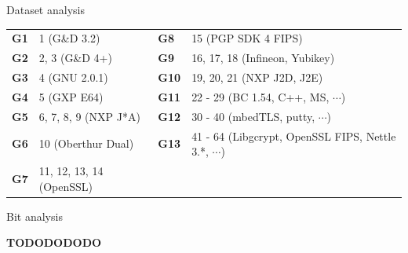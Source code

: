 \documentclass{beamer}
\begin{document}
\begin{darkframes}
\begin{frame}{Dataset analysis}
      \begin{table}[!b]
        {\carlitoTLF %
        \begin{tabularx}{\textwidth}{sX|sX}
          \toprule
          \textbf{G1} & 1 {\color[HTML]{9B9B9B} (G\&D 3.2)} & \textbf{G8} & 15 {\color[HTML]{9B9B9B} (PGP SDK 4 FIPS)} \\
          \textbf{G2} & 2, 3 {\color[HTML]{9B9B9B} (G\&D 4+)} & \textbf{G9} & 16, 17, 18 {\color[HTML]{9B9B9B} (Infineon, Yubikey)} \\
          \textbf{G3} & 4 {\color[HTML]{9B9B9B} (GNU 2.0.1)} & \textbf{G10} & 19, 20, 21 {\color[HTML]{9B9B9B} (NXP J2D, J2E)} \\
          \textbf{G4} & 5 {\color[HTML]{9B9B9B} (GXP E64)} & \textbf{G11} & 22 - 29 {\color[HTML]{9B9B9B} (BC 1.54, C++, MS, $\cdots$)} \\
          \textbf{G5} & 6, 7, 8, 9 {\color[HTML]{9B9B9B} (NXP J*A)} & \textbf{G12} & 30 - 40 {\color[HTML]{9B9B9B} (mbedTLS, putty, $\cdots$)} \\     
          \textbf{G6} & 10 {\color[HTML]{9B9B9B} (Oberthur Dual)} & \textbf{G13} & 41 - 64 {\color[HTML]{9B9B9B} (Libgcrypt, OpenSSL FIPS, Nettle 3.*, $\cdots$)} \\
          \textbf{G7} & 11, 12, 13, 14 {\color[HTML]{9B9B9B} (OpenSSL)} & & \\
          \bottomrule
        \end{tabularx}}
      \end{table}
    \end{frame}

    \begin{frame}{Bit analysis}

     \textbf{TODODODODO}

    \end{frame}


\end{darkframes}
\end{document}
